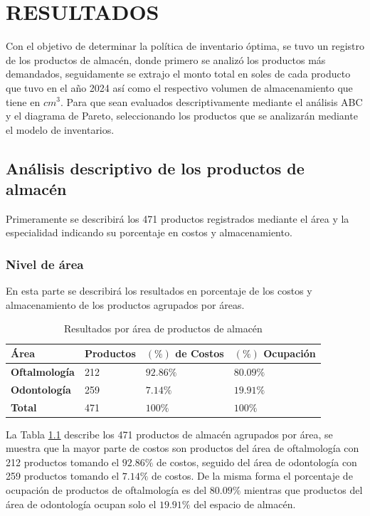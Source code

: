 \newpage
\chapter{RESULTADOS}

Con el objetivo de determinar la política de inventario óptima, se tuvo un registro de los productos de almacén, donde primero se analizó los productos más demandados, seguidamente se extrajo el monto total en soles de cada producto que tuvo en el año 2024 así como el respectivo volumen de almacenamiento que tiene en $cm^3$. Para que sean evaluados descriptivamente mediante el análisis ABC y el diagrama de Pareto, seleccionando los productos que se analizarán mediante el modelo de inventarios.

\section{Análisis descriptivo de los productos de almacén}

Primeramente se describirá los 471 productos registrados mediante el área y la especialidad indicando su porcentaje en costos y almacenamiento.

\subsection{Nivel de área}

En esta parte se describirá los resultados en porcentaje de los costos y almacenamiento de los productos agrupados por áreas.

\begin{table}[H]
    \caption{Resultados por área de productos de almacén}
    \begin{tabular}{p{2cm} p{2.51cm} p{4cm} p{4cm}} %
        \hline
        \textbf{Área} & \textbf{Productos} & \textbf{$(\%)$ de Costos} & \textbf{$(\%)$ Ocupación} \\
        \hline
        \textbf{Oftalmología} & 212 & $92.86\%$ & $80.09\%$ \\
        \textbf{Odontología} & 259 & $7.14\%$ & $19.91\%$ \\
        \hline
        \textbf{Total} & 471 & $100\%$ & $100\%$
    \end{tabular}
    \label{table:Area_productos}
\end{table}

La Tabla \ref{table:Area_productos} describe los 471 productos de almacén agrupados por área, se muestra que la mayor parte de costos son productos del área de oftalmología con 212 productos tomando el $92.86\%$ de costos, seguido del área de odontología con 259 productos tomando el $7.14\%$ de costos. De la misma forma el porcentaje de ocupación de productos de oftalmología es del $80.09\%$ mientras que productos del área de odontología ocupan solo el $19.91\%$ del espacio de almacén.

